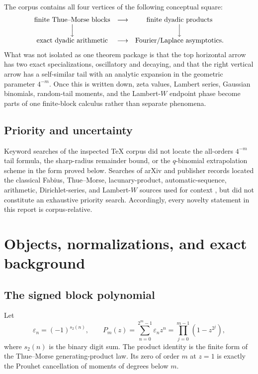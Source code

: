 \documentclass[11pt,oneside]{article}
\numberwithin{equation}{section}
\theoremstyle{definition}
\theoremstyle{remark}
\newcommand{\eps}{\varepsilon}
\begin{document}
The corpus contains all four vertices of the following conceptual square:
\[
\begin{array}{ccc}
\text{finite Thue--Morse blocks} & \longrightarrow & \text{finite dyadic products}\\
\Big\downarrow && \Big\downarrow\\
\text{exact dyadic arithmetic} & \longrightarrow & \text{Fourier/Laplace asymptotics}.
\end{array}
\]
What was not isolated as one theorem package is that the top horizontal arrow has two exact
specializations, oscillatory and decaying, and that the right vertical arrow has a
self-similar tail with an analytic expansion in the geometric parameter $4^{-m}$.  Once this
is written down, zeta values, Lambert series, Gaussian binomials, random-tail moments, and the
Lambert-$W$ endpoint phase become parts of one finite-block calculus rather than separate
phenomena.

\subsection{Priority and uncertainty}

Keyword searches of the inspected TeX corpus did not locate the all-orders $4^{-m}$ tail
formula, the sharp-radius remainder bound, or the $q$-binomial extrapolation scheme in the
form proved below.  Searches of arXiv and publisher records located the classical Fabius,
Thue--Morse, lacunary-product, automatic-sequence, arithmetic, Dirichlet-series, and
Lambert-$W$ sources used for context \cite{p3:arias1982,p3:arias2017arith,p3:aistleitner2015,p3:toth2022,p3:corless1996,p3:allouche2003}, but did not constitute an exhaustive priority search.  Accordingly, every novelty statement in this report is
corpus-relative.

\section{Objects, normalizations, and exact background}
\label{p3:sec:objects}

\subsection{The signed block polynomial}

Let
\begin{equation}
 \eps_n=(-1)^{s_2(n)},\qquad
 P_m(z)=\sum_{n=0}^{2^m-1}\eps_n z^n
       =\prod_{j=0}^{m-1}\left(1-z^{2^j}\right),
 \label{p3:eq:Pm}
\end{equation}
where $s_2(n)$ is the binary digit sum.  The product identity is the finite form of the
Thue--Morse generating-product law.  Its zero of order $m$ at $z=1$ is exactly the Prouhet
cancellation of moments of degrees below $m$.
\end{document}
